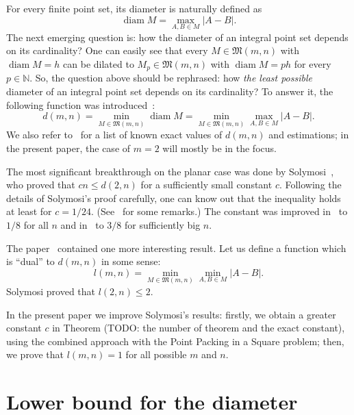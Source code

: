 \documentclass[a4paper,14pt]{article} %
\theoremstyle{plain}
\theoremstyle{definition}
\begin{document}
For every finite point set, its diameter is naturally defined as
\begin{equation}
	\operatorname{diam} M = \max_{A,B\in M} |A-B|
	.
\end{equation}
The next emerging question is: how the diameter of an integral point set depends on its cardinality?
One can easily see that every $M\in\mathfrak{M}(m,n)$ with $\operatorname{diam} M = h$
can be dilated to $M_p\in\mathfrak{M}(m,n)$ with $\operatorname{diam} M = ph$
for every $p\in\mathbb{N}$.
So, the question above should be rephrased:
how \textit{the least possible} diameter of an integral point set depends on its cardinality?
To answer it, the following function was introduced~\cite{kurz2008bounds,kurz2008minimum}:
\begin{equation}
	d(m,n) = \min_{M\in\mathfrak{M}(m,n)} \operatorname{diam} M = \min_{M\in\mathfrak{M}(m,n)} \max_{A,B\in M} |A-B|
	.
\end{equation}
We also refer to~\cite{kurz2008bounds} for a list of known exact values of $d(m,n)$
and estimations; in the present paper, the case of $m=2$ will mostly be in the focus.

The most significant breakthrough on the planar case was done by Solymosi~\cite{solymosi2003note},
who proved that $cn \leq d(2,n)$ for a sufficiently small constant $c$.
Following the details of Solymosi's proof carefully,
one can know out that the inequality holds at least for $c = 1/24$.
(See~\cite[Exercise 2.6]{garibaldi2005erdos} for some remarks.)
The constant was improved in~\cite{our-mz-rus} to $1/8$ for all $n$ and in~\cite{our-vmmsh-2018}
to $3/8$ for sufficiently big $n$.

The paper~\cite{solymosi2003note} contained one more interesting result.
Let us define a function which is ``dual'' to $d(m,n)$ in some sense:
\begin{equation}
	l(m,n) = \min_{M\in\mathfrak{M}(m,n)} \min_{A,B\in M} |A-B|
	.
\end{equation}
Solymosi proved that $l(2,n)\leq 2$.

In the present paper we improve Solymosi's results:
firstly, we obtain a greater constant $c$ in Theorem (TODO: the number of theorem and the exact constant),
using the combined approach with the Point Packing in a Square problem;
then, we prove that $l(m,n)=1$ for all possible $m$ and $n$.

\section{Lower bound for the diameter}
\end{document}
